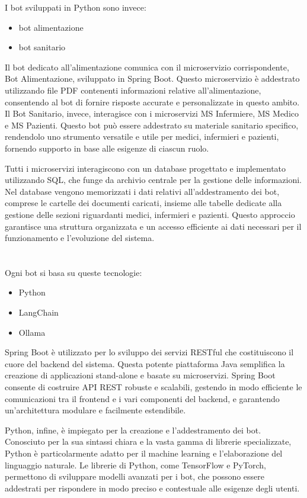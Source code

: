 \documentclass[a4paper,twoside,12pt]{toptesi}
\begin{document}
I bot sviluppati in Python sono invece:
\begin{itemize}
\item bot alimentazione
\item bot sanitario
\end{itemize}

Il bot dedicato all'alimentazione comunica con il microservizio corrispondente, Bot Alimentazione, sviluppato in Spring Boot. Questo microservizio è addestrato utilizzando file PDF contenenti informazioni relative all'alimentazione, consentendo al bot di fornire risposte accurate e personalizzate in questo ambito. Il Bot Sanitario, invece, interagisce con i microservizi MS Infermiere, MS Medico e MS Pazienti. Questo bot può essere addestrato su materiale sanitario specifico, rendendolo uno strumento versatile e utile per medici, infermieri e pazienti, fornendo supporto in base alle esigenze di ciascun ruolo.

Tutti i microservizi interagiscono con un database progettato e implementato utilizzando SQL, che funge da archivio centrale per la gestione delle informazioni. Nel database vengono memorizzati i dati relativi all'addestramento dei bot, comprese le cartelle dei documenti caricati, insieme alle tabelle dedicate alla gestione delle sezioni riguardanti medici, infermieri e pazienti. Questo approccio garantisce una struttura organizzata e un accesso efficiente ai dati necessari per il funzionamento e l'evoluzione del sistema.
\\ \\ \\
Ogni bot si basa su queste tecnologie:

\begin{itemize}
\item Python
\item LangChain
\item Ollama
\end{itemize} 

Spring Boot è utilizzato per lo sviluppo dei servizi RESTful che costituiscono il cuore del backend del sistema. Questa potente piattaforma Java semplifica la creazione di applicazioni stand-alone e basate su microservizi. Spring Boot consente di costruire API REST robuste e scalabili, gestendo in modo efficiente le comunicazioni tra il frontend e i vari componenti del backend, e garantendo un'architettura modulare e facilmente estendibile.

Python, infine, è impiegato per la creazione e l'addestramento dei bot. Conosciuto per la sua sintassi chiara e la vasta gamma di librerie specializzate, Python è particolarmente adatto per il machine learning e l'elaborazione del linguaggio naturale. Le librerie di Python, come TensorFlow e PyTorch, permettono di sviluppare modelli avanzati per i bot, che possono essere addestrati per rispondere in modo preciso e contestuale alle esigenze degli utenti.
\end{document}
